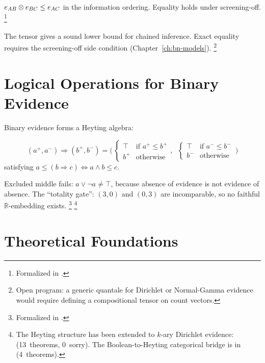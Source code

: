 \documentclass[11pt,openany]{report}
\begin{document}
\begin{theorem}
\label{thm:quantale-trans}
$e_{AB} \otimes e_{BC} \le e_{AC}$ in the information ordering.
Equality holds under screening-off.%
\footnote{Formalized in
.}
\end{theorem}

\noindent
The tensor gives a sound lower bound for chained inference.  Exact
equality requires the screening-off side condition
(Chapter~\ref{ch:bn-models}).%
\footnote{Open program: a generic quantale for Dirichlet or
Normal-Gamma evidence would require defining a compositional tensor
on count vectors.}


\section{Logical Operations for Binary Evidence}
\label{sec:binary-heyting}

Binary evidence forms a Heyting algebra:

\begin{definition}
\[
  (a^+, a^-) \Rightarrow (b^+, b^-) =
  \Big(\,\begin{cases} \top & \text{if } a^+ \le b^+ \\
                        b^+ & \text{otherwise}\end{cases},\;\;
        \begin{cases} \top & \text{if } a^- \le b^- \\
                        b^- & \text{otherwise}\end{cases}\,\Big)
\]
satisfying $a \le (b \Rightarrow c) \iff a \wedge b \le c$.
\end{definition}

\noindent
Excluded middle fails: $a \vee \neg a \ne \top$, because absence of
evidence is not evidence of absence.  The ``totality gate'':
$(3,0)$ and $(0,3)$ are incomparable, so no faithful
$\mathbb{R}$-embedding exists.%
\footnote{Formalized in
.}%
\footnote{The Heyting structure has been extended to $k$-ary
Dirichlet evidence: 
(13~theorems, 0~sorry).  The Boolean-to-Heyting categorical bridge is in
 (4~theorems).}


\section{Theoretical Foundations}
\end{document}
